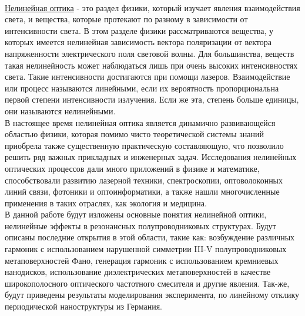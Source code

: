 \\
\hspace*{2mm}
\underline{Нелинейная оптика} - это раздел физики, который изучает явления взаимодействия света, и вещества, которые протекают по разному в зависимости от интенсивности света. В этом разделе физики рассматриваются вещества, у которых имеется нелинейная зависимость вектора поляризации от вектора напряженности электрического поля световой волны. Для большинства, веществ такая нелинейность может наблюдаться лишь при очень высоких интенсивностях света. Такие интенсивности достигаются при помощи лазеров. Взаимодействие или процесс называются линейными, если их вероятность пропорциональна первой степени интенсивности излучения. Если же эта, степень больше единицы, они называются нелинейными.
\\
\hspace*{2mm}
В настоящее время нелинейная оптика является динамично развивающейся областью физики, которая помимо чисто теоретической системы знаний приобрела также существенную практическую составляющую, что позволило решить ряд важных прикладных и инженерных задач. Исследования нелинейных оптических процессов дали много приложений в физике и математике, способствовали развитию лазерной техники, спектроскопии, оптоволоконных линий связи, фотоники и оптоинформатики, а также нашли многочисленные применения в таких отраслях, как экология и медицина.
\\
\hspace*{2mm}
В данной работе будут изложены основные понятия нелинейной оптики, нелинейные эффекты в резонансных полупроводниковых структурах. Будут описаны последние открытия в этой области, такие как: возбуждение различных гармоник с использованием нарушенной симметрии III-V полупроводниковых метаповерхностей Фано, генерация гармоник с использованием кремниевых нанодисков, использование диэлектрических метаповерхностей в качестве широкополосного оптического частотного смесителя и другие явления. Так-же, будут приведены результаты моделирования эксперимента, по линейному отклику периодической наноструктуры из Германия.

